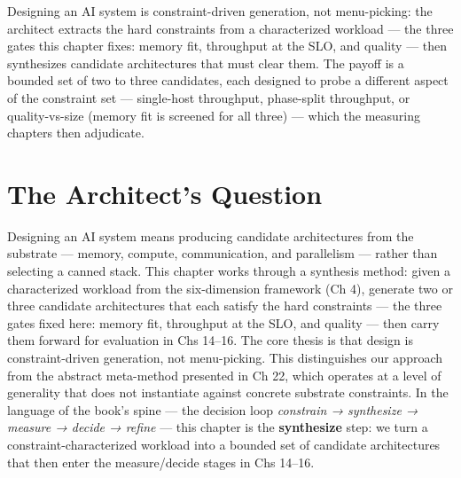Designing an AI system is constraint-driven generation, not
menu-picking: the architect extracts the hard constraints from a
characterized workload --- the three gates this chapter fixes: memory
fit, throughput at the SLO, and quality --- then synthesizes candidate
architectures that must clear them. The payoff is a bounded set of two
to three candidates, each designed to probe a different aspect of the
constraint set --- single-host throughput, phase-split throughput, or
quality-vs-size (memory fit is screened for all three) --- which the
measuring chapters then adjudicate.

\section*{The Architect's Question}\label{the-architects-question}

Designing an AI system means producing candidate architectures from the
substrate --- memory, compute, communication, and parallelism --- rather
than selecting a canned stack. This chapter works through a synthesis
method: given a characterized workload from the six-dimension framework
(Ch 4), generate two or three candidate architectures that each satisfy
the hard constraints --- the three gates fixed here: memory fit,
throughput at the SLO, and quality --- then carry them forward for
evaluation in Chs 14--16. The core thesis is that design is
constraint-driven generation, not menu-picking. This distinguishes our
approach from the abstract meta-method presented in Ch 22, which
operates at a level of generality that does not instantiate against
concrete substrate constraints. In the language of the book's spine ---
the decision loop \emph{constrain → synthesize → measure → decide →
refine} --- this chapter is the \textbf{synthesize} step: we turn a
constraint-characterized workload into a bounded set of candidate
architectures that then enter the measure/decide stages in Chs 14--16.

\label{concept}


